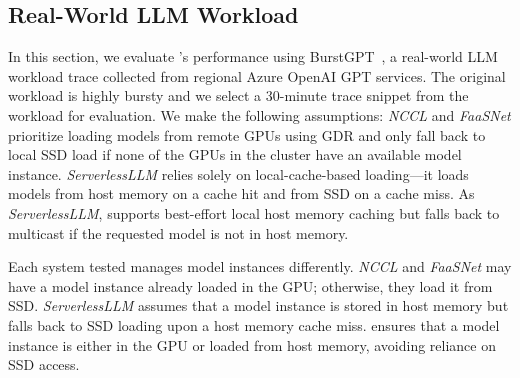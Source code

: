 {{\subsection{Real-World LLM Workload}
\label{subsec:e2e}

In this section, we evaluate \SysName's performance using BurstGPT~\cite{burstGPT_arxiv24}, a real-world LLM workload trace collected from regional Azure OpenAI GPT services. The original workload is highly bursty and we select a 30-minute trace snippet from the workload for evaluation.
We make the following assumptions:
\textit{NCCL} and \textit{FaaSNet} prioritize loading models from remote GPUs using GDR and only fall back to local SSD load if none of the GPUs in the cluster have an available model instance. 
\textit{ServerlessLLM} relies solely on local-cache-based loading---it loads models from host memory on a cache hit and from SSD on a cache miss.
As \textit{ServerlessLLM}, \SysName supports best-effort local host memory caching but falls back to \AlgoName multicast if the requested model is not in host memory. 

Each system tested manages model instances differently.
\textit{NCCL} and \textit{FaaSNet} may have a model instance already loaded in the GPU; otherwise, they load it from SSD. 
\textit{ServerlessLLM} assumes that a model instance is stored in host memory but falls back to SSD loading upon a host memory cache miss. 
\SysName ensures that a model instance is either in the GPU or loaded from host memory, avoiding reliance on SSD access.
\fi 

}}
